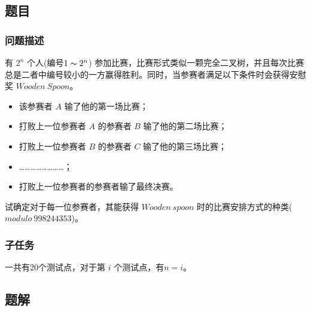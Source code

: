 \documentclass[UTF8, 12pt, a4paper, oneside]{ctexart}
\begin{document}
\subsection{题目}
\subsubsection{问题描述}
\par 有 $2^n$ 个人(编号$1 \thicksim  2^n$) 参加比赛，比赛形式类似一颗完全二叉树，并且每次比赛总是二者中编号较小的一方赢得胜利。同时，当参赛者满足以下条件时会获得安慰奖 $Wooden \ Spoon$。
\begin{itemize}
    \item 该参赛者 $A$ 输了他的第一场比赛；
    \item 打败上一位参赛者 $A$ 的参赛者 $B$ 输了他的第二场比赛；
    \item 打败上一位参赛者 $B$ 的参赛者 $C$ 输了他的第三场比赛；
    \item ……………………；
    \item 打败上一位参赛者的参赛者输了最终决赛。
\end{itemize}
\par 试确定对于每一位参赛者，其能获得 $Wooden \ spoon$ 时的比赛安排方式的种类($modulo \ 998244353$)。
\subsubsection{子任务}
\par 一共有20个测试点，对于第 $i$ 个测试点，有$n = i$。
\subsection{题解}
\end{document}
